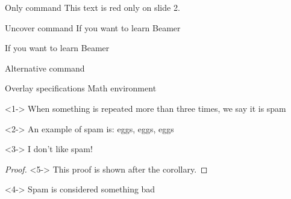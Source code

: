 \documentclass{beamer}
\begin{document}
\begin{frame}{Only command}
      This text is red only on slide 2.
\end{frame}

\begin{frame}{Uncover command}
    If you want to learn Beamer
    
    If you want to learn Beamer
\end{frame}


\begin{frame}{Alternative command}
\end{frame}

\begin{frame}{Overlay specifications Math environment}
    \begin{definition}<1->
    When something is repeated more than three times, we say it is spam
\end{definition}
\begin{example}<2->
    An example of spam is: eggs, eggs, eggs
\end{example}
\begin{theorem}<3->
    I don’t like spam!
\end{theorem}
\begin{proof}<5->
    This proof is shown after the corollary.
\end{proof}
\begin{corollary}<4->
    Spam is considered something bad
\end{corollary}
\end{frame}
\end{document}
